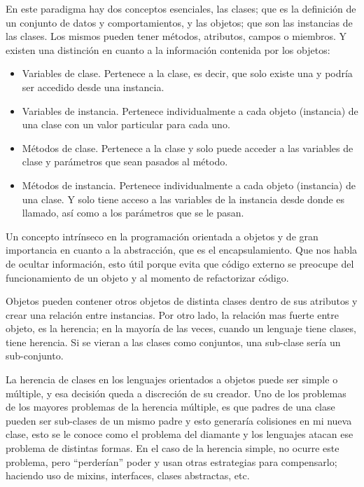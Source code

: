 \documentclass[12pt,letterpaper,titlepage,oneside,openright]{book}
\begin{document}
En este paradigma hay dos conceptos esenciales, las clases; que es la definición de un conjunto de datos y comportamientos, y las objetos; que son las instancias de las clases. Los mismos pueden tener métodos, atributos, campos o miembros. Y existen una distinción en cuanto a la información contenida por los objetos:

\begin{itemize}
    \item Variables de clase. Pertenece a la clase, es decir, que solo existe una y podría ser accedido desde una instancia.
    \item Variables de instancia. Pertenece individualmente a cada objeto (instancia) de una clase con un valor particular para cada uno.
    \item Métodos de clase. Pertenece a la clase y solo puede acceder a las variables de clase y parámetros que sean pasados al método.
    \item Métodos de instancia. Pertenece individualmente a cada objeto (instancia) de una clase. Y solo tiene acceso a las variables de la instancia desde donde es llamado, así como a los parámetros que se le pasan.
\end{itemize}

Un concepto intrínseco en la programación orientada a objetos y de gran importancia en cuanto a la abstracción, que es el encapsulamiento. Que nos habla de ocultar información, esto útil porque evita que código externo se preocupe del funcionamiento de un objeto y al momento de refactorizar código.

Objetos pueden contener otros objetos de distinta clases dentro de sus atributos y crear una relación entre instancias. Por otro lado, la relación mas fuerte entre objeto, es la herencia; en la mayoría de las veces, cuando un lenguaje tiene clases, tiene herencia. Si se vieran a las clases como conjuntos, una sub-clase sería un sub-conjunto.

La herencia de clases en los lenguajes orientados a objetos puede ser simple o múltiple, y esa decisión queda a discreción de su creador. Uno de los problemas de los mayores problemas de la herencia múltiple, es que padres de una clase pueden ser sub-clases de un mismo padre y esto generaría colisiones en mi nueva clase, esto se le conoce como el problema del diamante y los lenguajes atacan ese problema de distintas formas. En el caso de la herencia simple, no ocurre este problema, pero ``perderían'' poder y usan otras estrategias para compensarlo; haciendo uso de mixins, interfaces, clases abstractas, etc.
\end{document}

